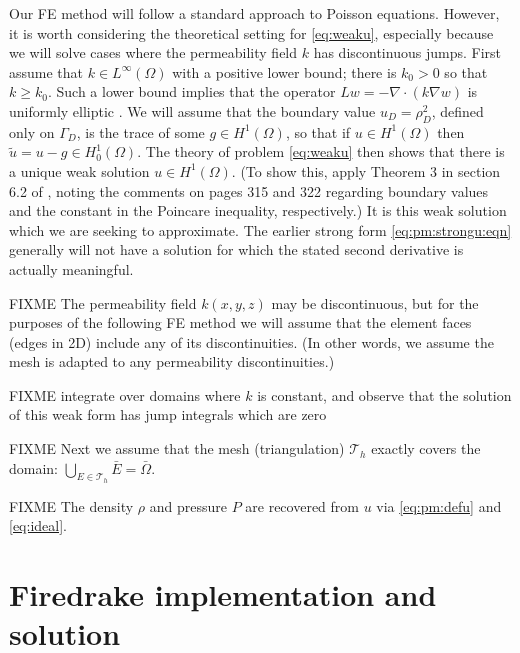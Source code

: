 \documentclass[11pt]{amsart}
\newcommand{\cT}{\mathcal{T}}
\newcommand{\Div}{\nabla\cdot}
\newcommand{\grad}{\nabla}
\begin{document}
Our FE method will follow a standard approach to Poisson equations.  However, it is worth considering the theoretical setting for \eqref{eq:weaku}, especially because we will solve cases where the permeability field $k$ has discontinuous jumps.  First assume that $k\in L^\infty(\Omega)$ with a positive lower bound; there is $k_0>0$ so that $k \ge k_0$.  Such a lower bound implies that the operator $L w = - \Div(k \grad w)$ is uniformly elliptic \citep[section 6.1]{Evans2010}.  We will assume that the boundary value $u_D = \rho_D^2$, defined only on $\Gamma_D$, is the trace of some $g\in H^1(\Omega)$, so that if $u\in H^1(\Omega)$ then $\tilde u = u - g \in H_0^1(\Omega)$.  The theory of problem \eqref{eq:weaku} then shows that there is a unique weak solution $u\in H^1(\Omega)$.  (To show this, apply Theorem 3 in section 6.2 of \citep{Evans2010}, noting the comments on pages 315 and 322 regarding boundary values and the constant in the Poincare inequality, respectively.)  It is this weak solution which we are seeking to approximate.  The earlier strong form \eqref{eq:pm:strongu:eqn} generally will not have a solution for which the stated second derivative is actually meaningful.

FIXME The permeability field $k(x,y,z)$ may be discontinuous, but for the purposes of the following FE method we will assume that the element faces (edges in 2D) include any of its discontinuities.  (In other words, we assume the mesh is adapted to any permeability discontinuities.)

FIXME integrate over domains where $k$ is constant, and observe that the solution of this weak form has jump integrals which are zero

FIXME Next we assume that the mesh (triangulation) $\cT_h$ exactly covers the domain: $\bigcup_{E\in\cT_h} \bar E = \bar \Omega$.

FIXME The density $\rho$ and pressure $P$ are recovered from $u$ via \eqref{eq:pm:defu} and \eqref{eq:ideal}.


\section{Firedrake implementation and solution}
\end{document}
